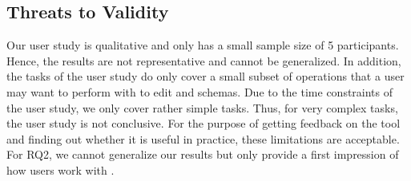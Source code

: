 
\subsection{Threats to Validity}\label{subsec:threads_to_validity} %

Our user study is qualitative and only has a small sample size of 5 participants.
Hence, the results are not representative and cannot be generalized.
In addition, the tasks of the user study do only cover a small subset of operations
that a user may want to perform with \toolname{} to edit \cfgfiles{} and schemas.
Due to the time constraints of the user study, we only cover rather simple tasks.
Thus, for very complex tasks, the user study is not conclusive.
For the purpose of getting feedback on the tool and finding out whether it is useful in practice, these limitations are acceptable.
For RQ2, we cannot generalize our results but only provide a first impression of how users work with \toolname{}.



